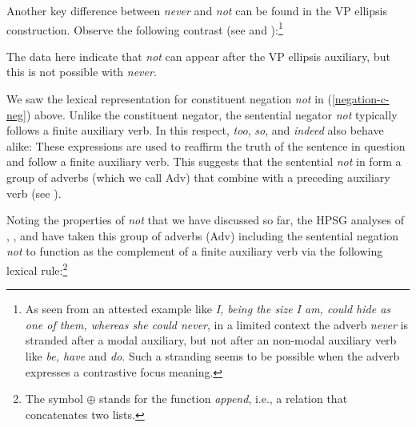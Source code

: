 \documentclass[output=paper
 	        ,biblatex
                ,babelshorthands
                ,newtxmath
                ,draftmode
                ,colorlinks, citecolor=brown
]{langscibook}
\begin{document}
\begin{exe}
\begin{xlist}
\begin{exe}
\begin{xlist}
Another key difference between \textit{never} and \textit{not} can be found in
the VP ellipsis construction.  Observe the following
contrast (see \citealt{Warner2000a-u} and \citealt{KS:02}):\footnote{As
seen from an attested example like {\it I, being the size I am, could hide as one of them, whereas she could never}, in a limited context the adverb {\it never} is stranded
after a modal auxiliary, but not after an non-modal auxiliary verb like {\it be, have}
and {\it do}. Such a stranding seems to be possible when the adverb
expresses a contrastive focus meaning.}

\eal
\label{negation-vpe-not-ex}
\zl
%
\noindent The data here indicate that \textit{not} can appear
after the VP ellipsis auxiliary, but this is not possible with
\emph{never}.
%
%

We saw the lexical representation for constituent negation
\textit{not} in (\ref{negation-c-neg}) above. Unlike the
constituent negator, the sentential negator \textit{not} typically
 follows a finite auxiliary verb. In this respect,
   \textit{too}, \textit{so}, and \textit{indeed} also behave alike:
\eal
{}
\zl
%
These expressions are used to
reaffirm the truth of the sentence in question and
follow a finite auxiliary verb.  This suggests
that the sentential \emph{not} in 
form a group of adverbs (which we call Adv) that combine with a
preceding auxiliary verb (see \citealt{Kim:00}).

Noting the properties of \emph{not} that we have discussed so far,
 the HPSG analyses of \citet{AG:97},
\citet{Kim:00}, and \citet{Warner2000a-u}
have taken this group of adverbs (Adv) including the sentential negation \emph{not} to function as the complement of a finite auxiliary verb via the following lexical rule:\footnote{The symbol $\oplus$ stands for the function \emph{append}, i.e., a relation that concatenates two lists.}


\end{xlist}
\end{exe}
\end{xlist}
\end{exe}
\end{document}
